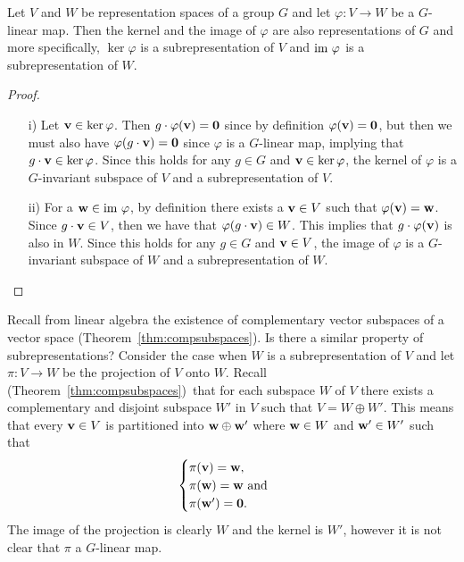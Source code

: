\begin{proposition}\label{prop:kernelimagelinearmap}
	Let $V$ and $W$ be representation spaces of a group $G$ and let $\varphi: V \rightarrow W$ be a $G$-linear map. Then the kernel and the image of $\varphi$ are also representations of $G$ and more specifically, $\ker \varphi$ is a subrepresentation of $V$ and $\text{im } \varphi$ is a subrepresentation of $W$.
\end{proposition}
\begin{proof}
	\begin{itemize}
		\item[i)] Let $\mathbf{v} \in \ker \varphi$. Then $g \cdot \varphi (\mathbf{v}) = \mathbf{0}$ since by definition $\varphi(\mathbf{v}) = \mathbf{0}$, but then we must also have $\varphi ( g \cdot \mathbf{v} ) = \mathbf{0}$ since $\varphi$ is a $G$-linear map, implying that $g \cdot \mathbf{v} \in \ker \varphi$. Since this holds for any $g \in G$ and $\mathbf{v} \in \ker \varphi$, the kernel of $\varphi$ is a $G$-invariant subspace of $V$ and a subrepresentation of $V$. 
		\item[ii)] For a $\mathbf{w} \in \text{im } \varphi$, by definition there exists a $\mathbf{v} \in V$ such that $\varphi(\mathbf{v}) = \mathbf{w}$. Since $g \cdot \mathbf{v} \in V$, then we have that $\varphi ( g \cdot \mathbf{v}) \in W$. This implies that $g \cdot \varphi (\mathbf{v})$ is also in $W$. Since this holds for any $g \in G$ and $\mathbf{v} \in V$, the image of $\varphi$ is a $G$-invariant subspace of $W$ and a subrepresentation of $W$.	\qedhere
	\end{itemize}
\end{proof}

Recall from linear algebra the existence of complementary vector subspaces of a vector space (Theorem~\ref{thm:compsubspaces}).  Is there a similar property of subrepresentations? Consider the case when $W$ is a subrepresentation of $V$ and let $\pi: V \rightarrow W$ be the projection of $V$ onto $W$. Recall (Theorem~\ref{thm:compsubspaces})~that for each subspace $W$ of $V$ there exists a complementary and disjoint subspace $W'$ in $V$ such that $V = W \oplus W'$. This means that every $\mathbf{v} \in V$ is partitioned into $\mathbf{w} \oplus \mathbf{w}'$ where $\mathbf{w} \in W$ and $\mathbf{w}' \in W'$ such that 
\begin{align*}
	\begin{cases}
		\pi(\mathbf{v}) = \mathbf{w}, \\
		\pi(\mathbf{w}) = \mathbf{w} \text{ and } \\
		\pi(\mathbf{w}') = \mathbf{0}.
	\end{cases}
\end{align*} 
The image of the projection is clearly $W$ and the kernel is $W'$, however it is not clear that $\pi$ a $G$-linear map.

